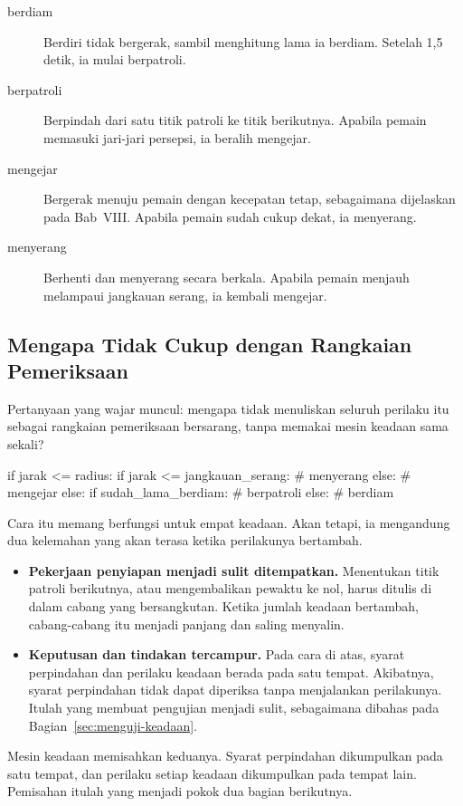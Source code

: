 \begin{description}
  \item[berdiam] Berdiri tidak bergerak, sambil menghitung lama ia berdiam.
        Setelah 1,5 detik, ia mulai berpatroli.
  \item[berpatroli] Berpindah dari satu titik patroli ke titik berikutnya.
        Apabila pemain memasuki jari-jari persepsi, ia beralih mengejar.
  \item[mengejar] Bergerak menuju pemain dengan kecepatan tetap, sebagaimana
        dijelaskan pada Bab~VIII. Apabila pemain sudah cukup dekat, ia
        menyerang.
  \item[menyerang] Berhenti dan menyerang secara berkala. Apabila pemain
        menjauh melampaui jangkauan serang, ia kembali mengejar.
\end{description}

\subsection{Mengapa Tidak Cukup dengan Rangkaian Pemeriksaan}

Pertanyaan yang wajar muncul: mengapa tidak menuliskan seluruh perilaku itu
sebagai rangkaian pemeriksaan bersarang, tanpa memakai mesin keadaan sama
sekali?

\begin{kodekeluaran}
if jarak <= radius:
    if jarak <= jangkauan_serang:
        # menyerang
    else:
        # mengejar
else:
    if sudah_lama_berdiam:
        # berpatroli
    else:
        # berdiam
\end{kodekeluaran}

Cara itu memang berfungsi untuk empat keadaan. Akan tetapi, ia mengandung dua
kelemahan yang akan terasa ketika perilakunya bertambah.

\begin{itemize}
  \item \textbf{Pekerjaan penyiapan menjadi sulit ditempatkan.} Menentukan
        titik patroli berikutnya, atau mengembalikan pewaktu ke nol, harus
        ditulis di dalam cabang yang bersangkutan. Ketika jumlah keadaan
        bertambah, cabang-cabang itu menjadi panjang dan saling menyalin.
  \item \textbf{Keputusan dan tindakan tercampur.} Pada cara di atas, syarat
        perpindahan dan perilaku keadaan berada pada satu tempat. Akibatnya,
        syarat perpindahan tidak dapat diperiksa tanpa menjalankan perilakunya.
        Itulah yang membuat pengujian menjadi sulit, sebagaimana dibahas pada
        Bagian~\ref{sec:menguji-keadaan}.
\end{itemize}

Mesin keadaan memisahkan keduanya. Syarat perpindahan dikumpulkan pada satu
tempat, dan perilaku setiap keadaan dikumpulkan pada tempat lain. Pemisahan
itulah yang menjadi pokok dua bagian berikutnya.
